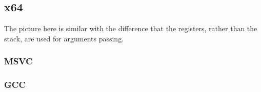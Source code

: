 \subsection{x64}

The picture here is similar with the difference that the registers, rather than the stack, are used for arguments passing.

\subsubsection{MSVC}



\ifdefined\IncludeGCC
\subsubsection{GCC}


\fi

